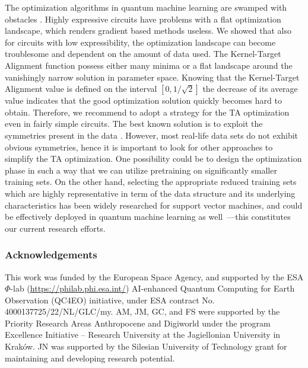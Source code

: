 \documentclass{article}
\begin{document}
The optimization algorithms in quantum machine learning  are swamped with obstacles \cite{anschuetz2022quantum}. Highly expressive circuits have problems with a flat optimization landscape, which renders gradient based methods useless. We showed that also for circuits with low expressibility, the optimization landscape can become troublesome and dependent on the amount of data used. The Kernel-Target Alignment function possess either many minima or a flat landscape around the vanishingly narrow solution in parameter space. Knowing that the Kernel-Target Alignment value is defined on the interval $[0,1/\sqrt{2}]$ the decrease of its average value indicates that the good optimization solution quickly becomes hard to obtain. Therefore, we recommend to adopt a strategy for the TA optimization even in fairly simple circuits. The best known solution is to exploit the symmetries present in the data \cite{glick2021covariant}. However, most real-life data sets do not exhibit obvious symmetries, hence it is important to look for other approaches to simplify the TA optimization. One possibility could be to design the optimization phase in such a way that we can utilize pretraining on significantly smaller training sets. On the other hand, selecting the appropriate reduced training sets which are highly representative in term of the data structure and its underlying characteristics has been widely researched for support vector machines, and could be effectively deployed in quantum machine learning as well~\cite{nalepa2019selecting}---this constitutes our current research efforts.




\subsubsection*{Acknowledgements} 

This work was funded by the European Space Agency,
and supported by the ESA $\Phi$-lab (\url{https://philab.phi.esa.int/}) AI-enhanced 
Quantum Computing for Earth Observation (QC4EO) 
initiative, under ESA contract No. 4000137725/22/NL/GLC/my. 
AM, JM, GC, and FS were supported by the Priority Research 
Areas Anthropocene and Digiworld under the program 
Excellence Initiative – Research University at the 
Jagiellonian University in Krak\'ow. JN was supported 
by the Silesian University of Technology grant for 
maintaining and developing research potential.
\end{document}
